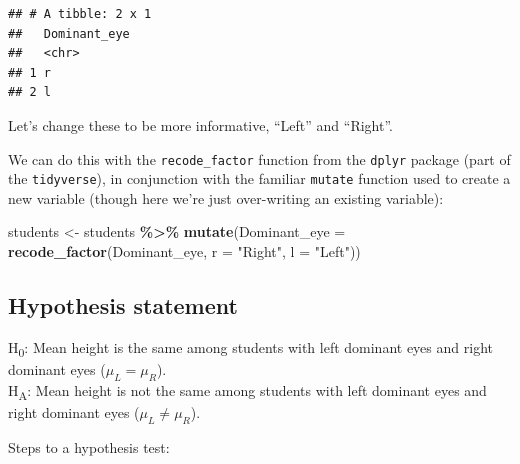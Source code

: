 \documentclass[
]{book}
\newenvironment{Shaded}{\begin{snugshade}}{\end{snugshade}}
\newcommand{\AttributeTok}[1]{\textcolor[rgb]{0.13,0.29,0.53}{#1}}
\newcommand{\FunctionTok}[1]{\textcolor[rgb]{0.13,0.29,0.53}{\textbf{#1}}}
\newcommand{\NormalTok}[1]{#1}
\newcommand{\OtherTok}[1]{\textcolor[rgb]{0.56,0.35,0.01}{#1}}
\newcommand{\SpecialCharTok}[1]{\textcolor[rgb]{0.81,0.36,0.00}{\textbf{#1}}}
\newcommand{\StringTok}[1]{\textcolor[rgb]{0.31,0.60,0.02}{#1}}
\begin{document}
\begin{verbatim}
## # A tibble: 2 x 1
##   Dominant_eye
##   <chr>       
## 1 r           
## 2 l
\end{verbatim}

Let's change these to be more informative, ``Left'' and ``Right''.

We can do this with the \texttt{recode\_factor} function from the \texttt{dplyr} package (part of the \texttt{tidyverse}), in conjunction with the familiar \texttt{mutate} function used to create a new variable (though here we're just over-writing an existing variable):

\begin{Shaded}
\begin{Highlighting}[]
\NormalTok{students }\OtherTok{\textless{}{-}}\NormalTok{ students }\SpecialCharTok{\%\textgreater{}\%}
  \FunctionTok{mutate}\NormalTok{(}\AttributeTok{Dominant\_eye =} \FunctionTok{recode\_factor}\NormalTok{(Dominant\_eye, }\AttributeTok{r =} \StringTok{"Right"}\NormalTok{, }\AttributeTok{l =} \StringTok{"Left"}\NormalTok{))}
\end{Highlighting}
\end{Shaded}

\subsection{Hypothesis statement}\label{twosamp_hyp}

H\textsubscript{0}: Mean height is the same among students with left dominant eyes and right dominant eyes (\(\mu_L = \mu_R\)).\\
H\textsubscript{A}: Mean height is not the same among students with left dominant eyes and right dominant eyes (\(\mu_L \ne \mu_R\)).

Steps to a hypothesis test:
\end{document}
